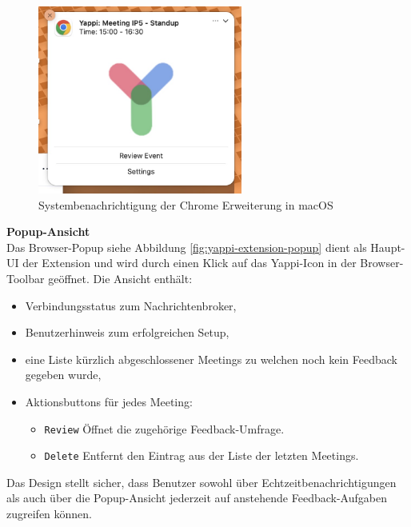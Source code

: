 \documentclass[12pt,a4paper]{report}
\begin{document}
            \begin{figure}[H]
              \centering
              \includegraphics[width=0.60\textwidth]{../figures/yappi-chrome-extension/yappi-extension-notification.jpg}
              \caption{Systembenachrichtigung der Chrome Erweiterung in macOS}
              \label{fig:yappi-extension-notification}
            \end{figure}


        \textbf{Popup-Ansicht} \\
            Das Browser-Popup siehe Abbildung \ref{fig:yappi-extension-popup} dient als Haupt-UI der Extension und wird durch einen
            Klick auf das Yappi-Icon in der Browser-Toolbar geöffnet.
            Die Ansicht enthält:
            \begin{itemize}
                \item Verbindungsstatus zum Nachrichtenbroker,
                \item Benutzerhinweis zum erfolgreichen Setup,
                \item eine Liste kürzlich abgeschlossener Meetings zu welchen noch kein Feedback gegeben wurde,
                \item Aktionsbuttons für jedes Meeting:
                    \begin{itemize}
                        \item \texttt{Review} Öffnet die zugehörige Feedback-Umfrage.
                        \item \texttt{Delete} Entfernt den Eintrag aus der Liste der letzten Meetings.
                    \end{itemize}
            \end{itemize}
            Das Design stellt sicher, dass Benutzer sowohl über Echtzeitbenachrichtigungen als auch über die Popup-Ansicht
            jederzeit auf anstehende Feedback-Aufgaben zugreifen können.
\end{document}
